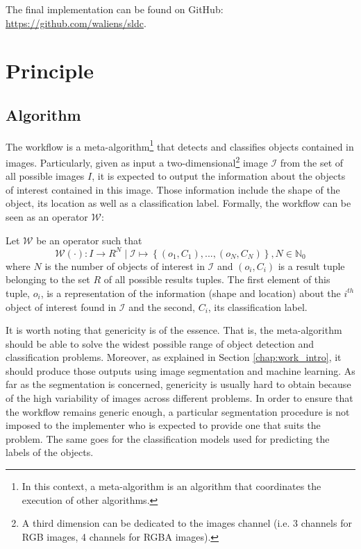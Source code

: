 The final implementation can be found on GitHub: \url{https://github.com/waliens/sldc}.

\section{Principle}
\label{sec:workflow_principle}

\subsection{Algorithm}
\label{ssec:workflow_algo}
The workflow is a meta-algorithm\footnote{In this context, a meta-algorithm is an algorithm that coordinates the execution of other algorithms.} that detects and classifies objects contained in images. Particularly, given as input a two-dimensional\footnote{A third dimension can be dedicated to the images channel (i.e. 3 channels for RGB images, 4 channels for RGBA images).} image $\mathcal{I}$ from the set of all possible images $I$, it is expected to output the information about the objects of interest contained in this image. Those information include the shape of the object, its location as well as a classification label. Formally, the workflow can be seen as an operator $\mathcal{W}$:

\begin{definition} Let $\mathcal{W}$ be an operator such that 
	\begin{equation}\label{eqn:workflow_operator}
		\mathcal{W}(\cdot) : I \rightarrow R^N \mid \mathcal{I} \mapsto \left\{(o_1,C_1),...,(o_N, C_N)\right\}, N \in \mathbb{N}_0
	\end{equation}
	where $N$ is the number of objects of interest in $\mathcal{I}$ and $(o_i, C_i)$ is a result tuple belonging to the set $R$ of all possible results tuples. The first element of this tuple, $o_i$, is a representation of the information (shape and location) about the $i^{th}$ object of interest found in $\mathcal{I}$ and the second, $C_i$, its classification label. 
\end{definition}

It is worth noting that genericity is of the essence. That is, the meta-algorithm should be able to solve the widest possible range of object detection and classification problems. Moreover, as explained in Section \ref{chap:work_intro}, it should produce those outputs using image segmentation and machine learning. As far as the segmentation is concerned, genericity is usually hard to obtain because of the high variability of images across different problems. In order to ensure that the workflow remains generic enough, a particular segmentation procedure is not imposed to the implementer who is expected to provide one that suits the problem. The same goes for the classification models used for predicting the labels of the objects. 

